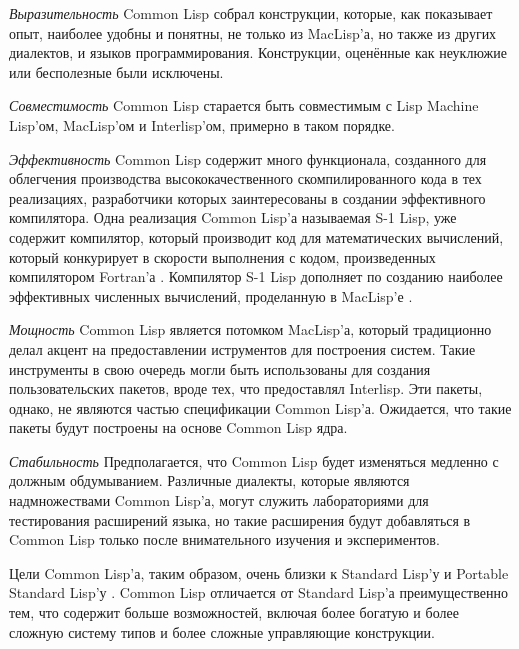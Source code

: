 \begin{flushdesc}
\item[\emph{Выразительность}]
Common Lisp собрал конструкции, которые, как показывает опыт, наиболее удобны и
понятны, не только из MacLisp'а, но также из других диалектов, и языков
программирования. Конструкции, оценённые как неуклюжие или бесполезные были
исключены. 

\item[\emph{Совместимость}]
Common Lisp старается быть совместимым с Lisp Machine Lisp'ом,
MacLisp'ом и Interlisp'ом, примерно в таком порядке.

\item[\emph{Эффективность}]
Common Lisp содержит много функционала, созданного для облегчения
производства высококачественного скомпилированного кода в тех
реализациях, разработчики которых заинтересованы в создании
эффективного компилятора. Одна реализация Common Lisp'а называемая
S-1 Lisp, уже содержит компилятор, который производит код для
математических вычислений, который конкурирует в скорости выполнения
с кодом, произведенных компилятором Fortran'а \cite{S1-COMPILER}. Компилятор S-1
Lisp дополняет по созданию наиболее эффективных численных вычислений,
проделанную в MacLisp'е \cite{MACLISP-BEATS-FORTRAN}.

\item[\emph{Мощность}]
Common Lisp является потомком MacLisp'а, который традиционно делал
акцент на предоставлении иструментов для построения систем. Такие инструменты в
свою очередь могли быть использованы для создания пользовательских
пакетов, вроде тех, что предоставлял Interlisp. Эти пакеты, однако, не
являются частью спецификации Common Lisp'а. Ожидается, что
такие пакеты будут построены на основе Common Lisp ядра.

\item[\emph{Стабильность}]
Предполагается, что Common Lisp будет изменяться медленно с
должным обдумыванием. 
Различные диалекты, которые являются надмножествами Common Lisp'а, могут служить
лабораториями для тестирования расширений языка, но такие расширения будут
добавляться в Common Lisp только после внимательного изучения и экспериментов.
\end{flushdesc}

Цели Common Lisp'а, таким образом, очень близки к Standard Lisp'у \cite{STANDARD-LISP-REPORT}
и Portable Standard Lisp'у \cite{PSL-MANUAL}. Common Lisp отличается от Standard
Lisp'а преимущественно тем, что содержит больше возможностей, включая более
богатую и более сложную систему типов и более сложные управляющие конструкции. 

